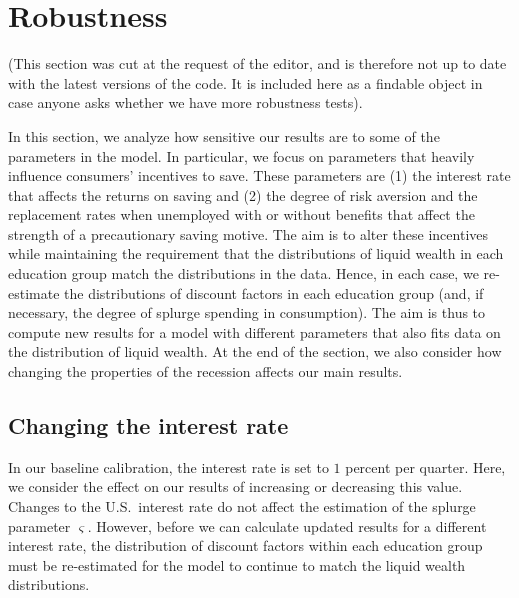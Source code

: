 \documentclass{econsocart}
\begin{document}
\FloatBarrier
\hypertarget{robustness}{}

\section*{Robustness}
\whenintegrated{\label{sec:robustness}} %

(This section was cut at the request of the editor, and is therefore not up to date with the latest versions of the code.  It is included here as a findable object in case anyone asks whether we have more robustness tests).

In this section, we analyze how sensitive our results are to some of the parameters in the model. In particular, we focus on parameters that heavily influence consumers' incentives to save. These parameters are (1) the interest rate that affects the returns on saving and (2) the degree of risk aversion and the replacement rates when unemployed with or without benefits that affect the strength of a precautionary saving motive. The aim is to alter these incentives while maintaining the requirement that the distributions of liquid wealth in each education group match the distributions in the data. Hence, in each case, we re-estimate the distributions of discount factors in each education group (and, if necessary, the degree of splurge spending in consumption). The aim is thus to compute new results for a model with different parameters that also fits data on the distribution of liquid wealth. At the end of the section, we also consider how changing the properties of the recession affects our main results.

\hypertarget{changing-the-interest-rate}{}\par\subsection*{Changing the interest rate}
\whenintegrated{\label{sec:robust_R}} %
In our baseline calibration, the interest rate is set to $1$ percent per quarter. Here, we consider the effect on our results of increasing or decreasing this value. Changes to the U.S.\ interest rate do not affect the estimation of the splurge parameter $\varsigma$. However, before we can calculate updated results for a different interest rate, the distribution of discount factors within each education group must be re-estimated for the model to continue to match the liquid wealth distributions.
\end{document}
